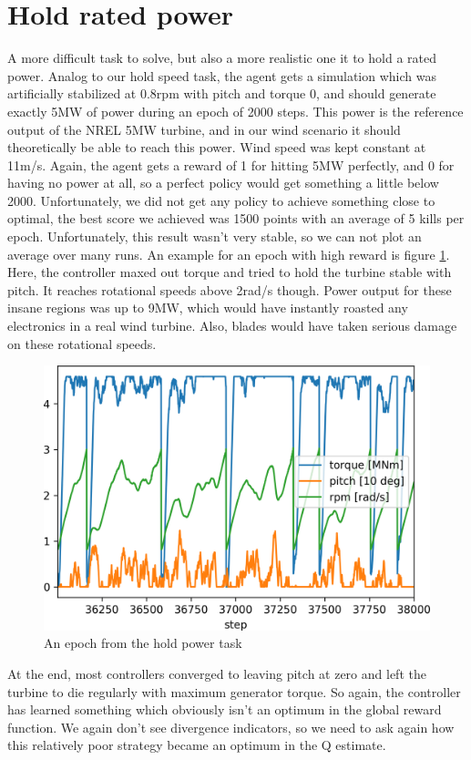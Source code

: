 \documentclass[hyperref,final,beleg]{cgvpub}
\begin{document}
\section{Hold rated power}
\label{sec:hold_rated_power}
A more difficult task to solve, but also a more realistic one it to hold a rated power. Analog to our hold speed task, the agent gets a simulation which was artificially stabilized at 0.8rpm with pitch and torque 0, and should generate exactly 5MW of power during an epoch of 2000 steps. This power is the reference output of the NREL 5MW turbine, and in our wind scenario it should theoretically be able to reach this power. Wind speed was kept constant at 11m/s. Again, the agent gets a reward of 1 for hitting 5MW perfectly, and 0 for having no power at all, so a perfect policy would get something a little below 2000. Unfortunately, we did not get any policy to achieve something close to optimal, the best score we achieved was 1500 points with an average of 5 kills per epoch. Unfortunately, this result wasn't very stable, so we can not plot an average over many runs. An example for an epoch with high reward is figure \ref{fig:crashing_turbines}. Here, the controller maxed out torque and tried to hold the turbine stable with pitch. It reaches rotational speeds above 2rad/s though. Power output for these insane regions was up to 9MW, which would have instantly roasted any electronics in a real wind turbine. Also, blades would have taken serious damage on these rotational speeds.

\begin{figure}
  \centering
  \includegraphics[width=0.5\linewidth]{images/crashing_turbines.png}
  \caption{An epoch from the hold power task}
  \label{fig:crashing_turbines}
\end{figure}

At the end, most controllers converged to leaving pitch at zero and left the turbine to die regularly with maximum generator torque. So again, the controller has learned something which obviously isn't an optimum in the global reward function. We again don't see divergence indicators, so we need to ask again how this relatively poor strategy became an optimum in the Q estimate.
\end{document}
